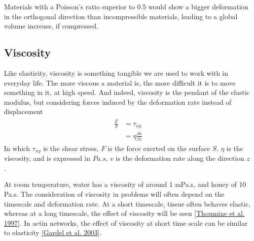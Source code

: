 \documentclass[A4paperpaper,11pt,english]{sphinxmanual}
\begin{document}
Materials with a Poisson's ratio superior to 0.5 would show a bigger
deformation in the orthogonal direction than incompressible materials, leading
to a global volume increase, if compressed.


\subsection{Viscosity}
\label{index-latex:viscosity}
Like elasticity, viscosity is something tangible we are used to work with in
everyday life. The more viscous a material is, the more difficult it is to move
something in it, at high speed. And indeed, viscosity is the pendant of the elastic
modulus, but considering forces induced by the deformation rate instead of displacement
\label{index-latex:equation-eqa12}\begin{gather}
\begin{split}\frac{F}{S} &= \tau_{xy} \\
            &= \eta \frac{\partial v}{\partial z}\end{split}\label{index-latex-eqa12}
\end{gather}
In which \(\tau_{xy}\) is the shear stress, \(F\) is the force exerted
on the surface \(S\). \(\eta\) is the viscosity, and is expressed in
\(Pa.s\), \(v\) is the deformation rate along the direction \(z\) .

At room temperature, water has a viscosity of around 1 mPa.s, and honey of 10 Pa.s. The consideration of viscosity in problems will
often depend on the timescale and deformation rate. At a short
timescale, tissue often behaves elastic, whereas at a long timescale, the effect
of viscosity will be seen {\hyperref[index-latex:thoumine1997]{{[}Thoumine et al. 1997{]}}}. In actin networks, the effect of
viscosity at short time scale can be similar to elasticity {\hyperref[index-latex:gardel2003]{{[}Gardel et al. 2003{]}}}.
\end{document}

